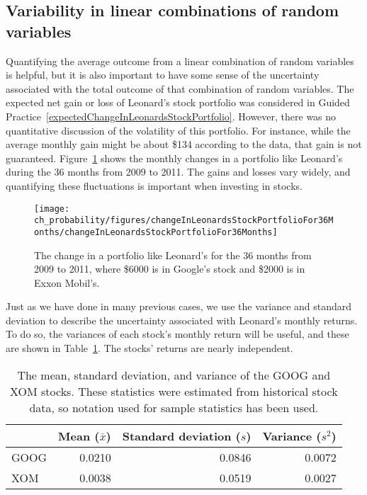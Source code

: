 \subsection{Variability in linear combinations of random variables}

Quantifying the average outcome from a linear combination of random variables is helpful, but it is also important to have some sense of the uncertainty associated with the total outcome of that combination of random variables. The expected net gain or loss of Leonard's stock portfolio was considered in Guided Practice~\ref{expectedChangeInLeonardsStockPortfolio}. However, there was no quantitative discussion of the volatility of this portfolio. For instance, while the average monthly gain might be about \$134 according to the data, that gain is not guaranteed. Figure~\ref{changeInLeonardsStockPortfolioFor36Months} shows the monthly changes in a portfolio like Leonard's during the 36 months from 2009 to 2011. The gains and losses vary widely, and quantifying these fluctuations is important when investing in stocks.

\begin{figure}[ht]
\centering
\texttt{[image: ch\_probability/figures/changeInLeonardsStockPortfolioFor36Months/changeInLeonardsStockPortfolioFor36Months]}
\caption{The change in a portfolio like Leonard's for the 36 months from 2009 to 2011, where \$6000 is in Google's stock and \$2000 is in Exxon Mobil's.}
\label{changeInLeonardsStockPortfolioFor36Months}
\end{figure}

Just as we have done in many previous cases, we use the variance and standard deviation to describe the uncertainty associated with Leonard's monthly returns. To do so, the variances of each stock's monthly return will be useful, and these are shown in Table~\ref{sumStatOfGOOGXOM}. The stocks' returns are nearly independent.

\begin{table}
\centering
\begin{tabular}{lrrr}
\hline
	& Mean ($\bar{x}$) & Standard deviation ($s$) & Variance ($s^2$) \\
\hline
GOOG & 0.0210	& 0.0846					&	0.0072	\\
XOM & 0.0038		& 0.0519					&	0.0027	\\
\hline
\end{tabular}
\caption{The mean, standard deviation, and variance of the GOOG and XOM stocks. These statistics were estimated from historical stock data, so notation used for sample statistics has been used.}
\label{sumStatOfGOOGXOM}
\end{table}

